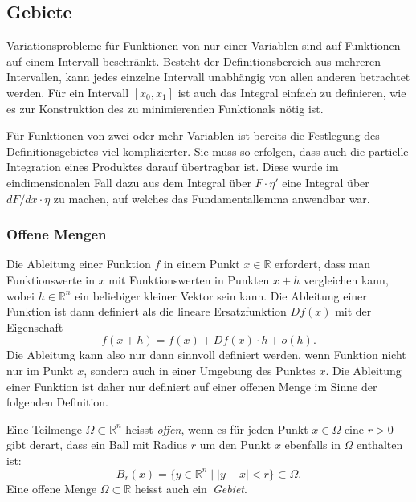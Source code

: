 %
%
%

%
%
\subsection{Gebiete}
Variationsprobleme für Funktionen von nur einer Variablen sind auf 
Funktionen auf einem Intervall beschränkt.
Besteht der Definitionsbereich aus mehreren Intervallen, kann jedes
einzelne Intervall unabhängig von allen anderen betrachtet werden.
Für ein Intervall $[x_0,x_1]$ ist auch das Integral einfach zu definieren,
wie es zur Konstruktion des zu minimierenden Funktionals nötig ist.

Für Funktionen von zwei oder mehr Variablen ist bereits die
Festlegung des Definitionsgebietes viel komplizierter.
Sie muss so erfolgen, dass auch die partielle Integration eines
Produktes darauf übertragbar ist.
Diese wurde im eindimensionalen Fall dazu aus dem Integral
über $F\cdot\eta'$ eine Integral über $dF/dx\cdot \eta$ zu
machen, auf welches das Fundamentallemma anwendbar war.

%
%
\subsubsection{Offene Mengen}
Die Ableitung einer Funktion $f$ in einem Punkt $x\in\mathbb{R}$ erfordert,
dass man Funktionswerte in $x$ mit Funktionswerten in Punkten $x+h$
vergleichen kann, wobei $h\in\mathbb{R}^n$ ein beliebiger kleiner Vektor
sein kann.
Die Ableitung einer Funktion ist dann definiert als die lineare
Ersatzfunktion $Df(x)$ mit der Eigenschaft
\[
f(x+h) = f(x) + Df(x)\cdot h + o(h).
\]
Die Ableitung kann also nur dann sinnvoll definiert werden, wenn
Funktion nicht nur im Punkt $x$, sondern auch in einer Umgebung
des Punktes $x$.
Die Ableitung einer Funktion ist daher nur definiert auf einer
offenen Menge im Sinne der folgenden Definition.

\begin{definition}
Eine Teilmenge $\Omega\subset\mathbb{R}^n$ heisst {\em offen}, wenn es für
%
jeden Punkt $x\in\Omega$ eine $r>0$ gibt derart, dass ein
Ball mit Radius $r$ um den Punkt $x$ ebenfalls in $\Omega$ enthalten
ist:
\[
B_r(x)
=
\{y\in\mathbb{R}^n
\mid
|y-x|<r\}
\subset \Omega.
\]
Eine offene Menge $\Omega\subset\mathbb{R}$ heisst auch ein {\em Gebiet}.
%

\end{definition}


